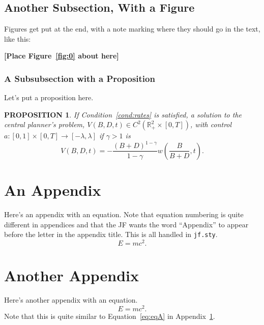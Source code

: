 \documentclass[11pt]{article}
\newtheorem{proposition}{PROPOSITION}
\begin{document}
\subsection{Another Subsection, With a Figure}
\label{sec:subsec}

Figures get put at the end, with a note marking where they should go in the text, like this:

\bigskip
\centerline{\bf [Place Figure~\ref{fig:0} about here]}
\bigskip

\subsubsection{A Subsubsection with a Proposition}
\label{sec:subsub}

Let's put a proposition here.
\begin{proposition} \label{prop:3}
If Condition~\ref{cond:rates} is satisfied,  a solution to the central
planner's problem, $V(B,D,t) \in C^2\left( {\mathbb R}_{+}^2 \times
  [0,T] \right)$, with control $a:[0,1]\times[0,T]\rightarrow [-\lambda,\lambda]$
 if  $\gamma>1$ is
\begin{equation} \label{eq:valuea}
V(B,D,t) =  - \frac{(B+D)^{1-\gamma}}{1-\gamma}   w\left(\frac{B}{B+D},t\right).
\end{equation}
\end{proposition}

\clearpage

\appendix

\section{An Appendix}
\label{sec:app1}

Here's an appendix with an equation. Note that equation numbering is quite different in appendices and that the JF wants the word ``Appendix'' to appear before the letter in the appendix title. This is all handled in \texttt{jf.sty}.
\begin{equation}
  E = mc^2.
\label{eq:eqA}
\end{equation}

\section{Another Appendix}
\label{sec:app2}

Here's another appendix with an equation.
\begin{equation}
  E = mc^2.
\end{equation}
Note that this is quite similar to Equation~\eqref{eq:eqA} in Appendix~\ref{sec:app1}.
\end{document}
